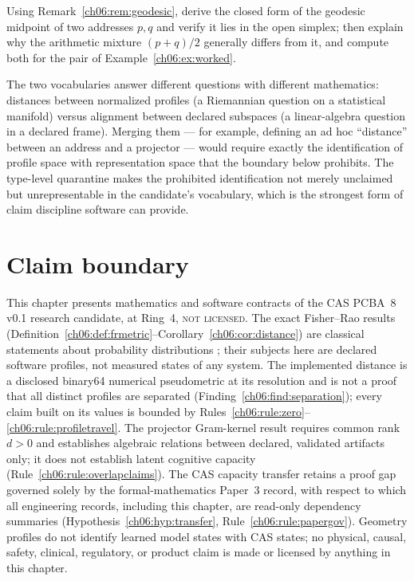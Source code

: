 \begin{exercise}\label{ch06:ex:midpointexercise}
Using Remark~\ref{ch06:rem:geodesic}, derive the closed form of the
geodesic midpoint of two addresses $p, q$ and verify it lies in the
open simplex; then explain why the arithmetic mixture $(p + q)/2$
generally differs from it, and compute both for the pair of
Example~\ref{ch06:ex:worked}.
\end{exercise}

\begin{remark}
The two vocabularies answer different questions with different
mathematics: distances between normalized profiles (a Riemannian
question on a statistical manifold) versus alignment between declared
subspaces (a linear-algebra question in a declared frame). Merging them
--- for example, defining an ad hoc ``distance'' between an address and
a projector --- would require exactly the identification of profile
space with representation space that the boundary below prohibits.
The type-level quarantine makes the prohibited identification not
merely unclaimed but unrepresentable in the candidate's vocabulary,
which is the strongest form of claim discipline software can provide.
\end{remark}

\section{Claim boundary}\label{ch06:sec:boundary}

\begin{boundary}\label{ch06:bnd:main}
This chapter presents mathematics and software contracts of the CAS
PCBA~8 v0.1 research candidate, at Ring~4, \textsc{not licensed}. The
exact Fisher--Rao results
(Definition~\ref{ch06:def:frmetric}--Corollary~\ref{ch06:cor:distance})
are classical statements about probability distributions
\cite{fisher,rao,amari,ay}; their subjects here are declared software
profiles, not measured states of any system. The implemented distance
is a disclosed binary64 numerical pseudometric at its resolution and is
not a proof that all distinct profiles are separated
(Finding~\ref{ch06:find:separation}); every claim built on its values
is bounded by Rules~\ref{ch06:rule:zero}--\ref{ch06:rule:profiletravel}.
The projector Gram-kernel result requires common rank $d > 0$ and
establishes algebraic relations between declared, validated artifacts
only; it does not establish latent cognitive capacity
(Rule~\ref{ch06:rule:overlapclaims}). The CAS capacity transfer retains
a proof gap governed solely by the formal-mathematics Paper~3 record,
with respect to which all engineering records, including this chapter,
are read-only dependency summaries
(Hypothesis~\ref{ch06:hyp:transfer}, Rule~\ref{ch06:rule:papergov}).
Geometry profiles do not identify learned model states with CAS states;
no physical, causal, safety, clinical, regulatory, or product claim is
made or licensed by anything in this chapter.
\end{boundary}
